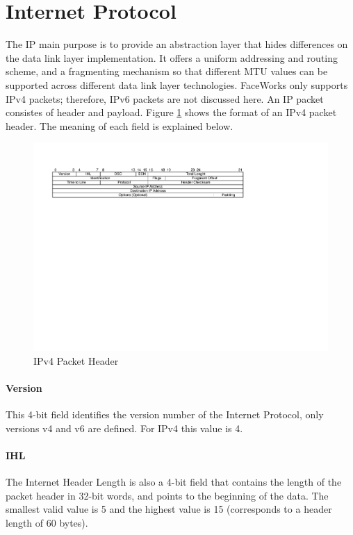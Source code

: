 \documentclass[defaultstyle,10pt,master,Helvetica]{thesis}
\begin{document}
\section{Internet Protocol}

The \acf{IP}\cite{rfc791} main purpose is to provide an abstraction layer that hides differences on the data link layer implementation. It offers a uniform addressing and routing scheme, and a fragmenting mechanism so that different \ac{MTU} values can be supported across different data link layer technologies. FaceWorks only supports IPv4 packets; therefore, IPv6 packets are not discussed here. An IP packet consistes of header and payload. Figure \ref{fig:ipv4} shows the format of an IPv4 packet header. The meaning of each field is explained below.

\begin{figure}[h]
  \centering
      \includegraphics[scale=0.80,center]{Diagrams/IP-Packet.pdf}
  \caption{IPv4 Packet Header}\label{fig:ipv4}
\end{figure}

\paragraph*{Version} This 4-bit field identifies the version number of the Internet Protocol, only versions v4 and v6 are defined. For IPv4 this value is 4.
\paragraph*{IHL} The Internet Header Length is also a 4-bit field that contains the length of the packet header in 32-bit words, and points to the beginning of the data. The smallest valid value is 5 and the highest value is 15 (corresponds to a header length of 60 bytes).
\end{document}
